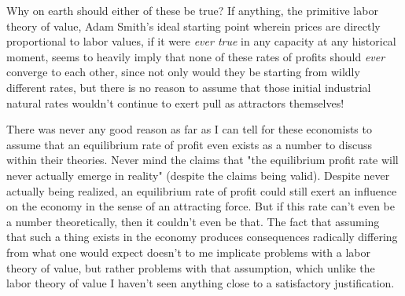 Why on earth should either of these be true? If anything, the primitive labor theory of value, Adam Smith's ideal starting point wherein prices are directly proportional to labor values, if it were \textit{ever true} in any capacity at any historical moment, seems to heavily imply that none of these rates of profits should \emph{ever} converge to each other, since not only would they be starting from wildly different rates, but there is no reason to assume that those initial industrial natural rates wouldn't continue to exert pull as attractors themselves! \par 
There was never any good reason as far as I can tell for these economists to assume that an equilibrium rate of profit even exists as a number to discuss within their theories. Never mind the claims that "the equilibrium profit rate will never actually emerge in reality" (despite the claims being valid). Despite never actually being realized, an equilibrium rate of profit could still exert an influence on the economy in the sense of an attracting force. But if this rate can't even be a number theoretically, then it couldn't even be that. The fact that assuming that such a thing exists in the economy produces consequences radically differing from what one would expect doesn't to me implicate problems with a labor theory of value, but rather problems with that assumption, which unlike the labor theory of value I haven't seen anything close to a satisfactory justification. 

